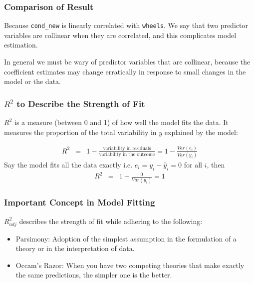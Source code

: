 \documentclass[handout]{beamer}
\newcommand{\blue}[1]{\textcolor{blue2}{#1}}
\begin{document}
\begin{frame}[fragile]
\frametitle{Comparison of Result}

Because {\tt cond\_new} is linearly correlated with {\tt wheels}.  We say that two predictor variables are \blue{collinear} when they are correlated, and this complicates model estimation.

\pause\vspace{0.5cm}

In general we must be wary of predictor variables that are collinear, because the coefficient estimates may change erratically in response to small changes in the model or the data.

\end{frame}


\begin{frame}[fragile]
\frametitle{$R^2$ to Describe the Strength of Fit}

%
%
$R^2$ is a measure (between 0 and 1) of how well the model fits the data.  It measures the proportion of the total variability in $y$ explained by the model:

\pause
\begin{eqnarray*}
R^2 &=& 1 - \frac{\mbox{variability in residuals}}{\mbox{variability in the outcome}} =  1 - \frac{Var(e_i)}{Var(y_i)}
\end{eqnarray*}
\pause
Say the model fits all the data \blue{exactly} i.e. $e_i = y_i - \widehat{y}_i=0$ for all $i$, then
\begin{eqnarray*}
R^2 &=& 1 - \frac{0}{Var(y_i)} = 1
\end{eqnarray*}

\end{frame}


\begin{frame}[fragile]
\frametitle{Important Concept in Model Fitting}

$R^2_{adj}$ describes the strength of fit while adhering to the following:
\begin{itemize}
\pause\item \blue{Parsimony}:  Adoption of the simplest assumption in the formulation of a theory or in the interpretation of data.
\pause\item \blue{Occam's Razor}: When you have two competing theories that make exactly the same predictions, the simpler one is the better.
\end{itemize}


\end{frame}
\end{document}
